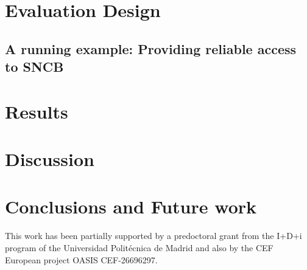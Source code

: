 \documentclass[sw]{iosart2x}
\begin{document}
\section{Evaluation Design}
\subsection{A running example: Providing reliable access to SNCB}

\section{Results}

\section{Discussion}

\section{Conclusions and Future work}

\begin{acks}
This work has been partially supported by a predoctoral grant from the I+D+i program of the Universidad Polit\'ecnica de Madrid and also by the CEF European project OASIS CEF-26696297.
\end{acks}




\end{document}
